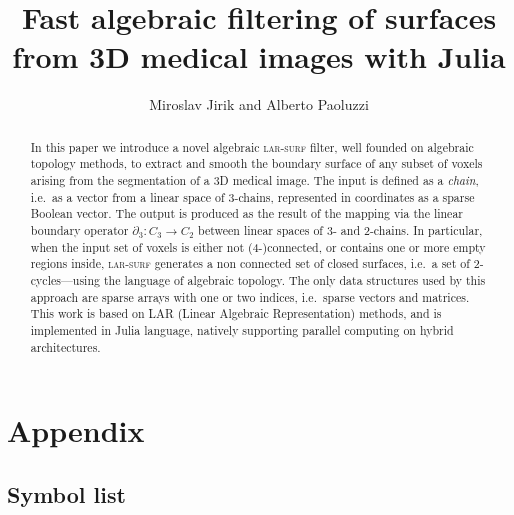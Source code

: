 \documentclass[11pt, oneside]{article}   	%
\title{Fast algebraic filtering of surfaces from 3D medical images with Julia}
\author{Miroslav Jirik and Alberto Paoluzzi}
\date{}							%
\begin{document}
\maketitle

\begin{abstract}
In this paper we introduce a novel algebraic \textsc{lar-surf} filter, well founded on algebraic topology methods, to extract and smooth the boundary surface of any subset of voxels arising from the segmentation of a 3D medical image. The input is defined as a \emph{chain}, i.e.~as a vector from a linear space of 3-chains, represented in coordinates as a sparse Boolean vector. The output is produced as the result of the mapping via the linear boundary operator $\partial_3:C_3 \to C_2$ between linear spaces of 3- and 2-chains.  In particular, when the input set of voxels is either not (4-)connected, or contains one or more empty regions inside, \textsc{lar-surf} generates a non connected set of closed surfaces, i.e.~a set of 2-cycles---using the language of algebraic topology. The only data structures used by this approach are sparse arrays with one or two indices, i.e.~sparse vectors and matrices. This work is based on LAR (Linear Algebraic Representation) methods, and is implemented in Julia language, natively supporting parallel computing on hybrid architectures.
\end{abstract}

\tableofcontents











\appendix
\section{Appendix}
\subsection{Symbol list}
\end{document}
